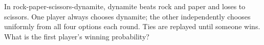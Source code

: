 In rock-paper-scissors-dynamite, dynamite beats rock and paper and loses to scissors. One player always chooses dynamite; the other independently chooses uniformly from all four options each round. Ties are replayed until someone wins. What is the first player's winning probability?
